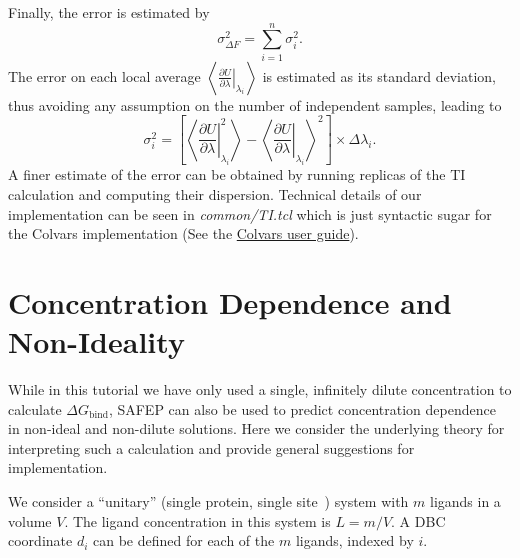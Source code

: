 \documentclass[9pt,tutorial]{Styling/livecoms}
\newcommand{\filepath}[1]{\textit{#1}}
\begin{document}
Finally, the error is estimated by
\begin{equation} \label{eq:TI_error}
    \sigma^2_{\Delta F} = \sum_{i=1}^n \sigma_i^2.
\end{equation}
The error on each local average $\left\langle \left. \frac{\partial U}{\partial \lambda} \right|_{\lambda_i} \right\rangle$ is estimated as its standard deviation, thus avoiding any assumption on the number of independent samples, leading to
\begin{equation} \label{eq:TI_increment_error}
    \sigma_i^2 = \left[
    \left\langle \left. \frac{\partial U}{\partial \lambda} \right|_{\lambda_i}^2 \right \rangle - 
    \left\langle \left. \frac{\partial U}{\partial \lambda} \right|_{\lambda_i} \right\rangle^2
    \right] \times \Delta \lambda_i.
\end{equation}
A finer estimate of the error can be obtained by running replicas of the TI calculation and computing their dispersion.
Technical details of our implementation can be seen in \filepath{common/TI.tcl} which is just syntactic sugar for the Colvars implementation (See the \href{http://colvars.github.io/colvars-refman-vmd/colvars-refman-vmd.html#sec:colvarbias_ti}{Colvars user guide}).


\section{Concentration Dependence and Non-Ideality} \label{app:bindingProbability}

While in this tutorial we have only used a single, infinitely dilute concentration to calculate  $\Delta G_\mathrm{bind}$, SAFEP can also be used to predict concentration dependence in non-ideal and non-dilute solutions.  Here we consider the underlying theory for interpreting such a calculation and provide general suggestions for implementation.

We consider a ``unitary'' (single protein, single site~\cite{Salari2018}) system with $m$ ligands in a volume $V$. The ligand concentration in this system is $L=m/V$. A DBC coordinate $d_i$ can be defined for each of the $m$ ligands, indexed by $i$.  
\end{document}
